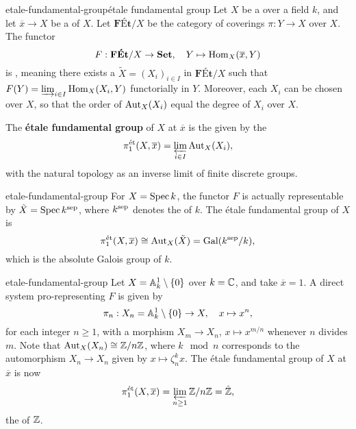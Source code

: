 \begin{topic}{etale-fundamental-group}{étale fundamental group}
    Let $X$ be a  over a field $k$, and let $\overline{x} \to X$ be a  of $X$. Let $\textbf{FÉt}/X$ be the category of   coverings $\pi : Y \to X$ over $X$. The functor
    \[ F : \textbf{FÉt}/X \to \textbf{Set}, \quad Y \mapsto \Hom_X(\overline{x}, Y) \]
    is , meaning there exists a  $\tilde{X} = (X_i)_{i \in I}$ in $\textbf{FÉt}/X$ such that $F(Y) = \varinjlim_{i \in I} \Hom_X(X_i, Y)$ functorially in $Y$. Moreover, each $X_i$ can be chosen  over $X$, so that the order of $\textup{Aut}_X(X_i)$ equal the degree of $X_i$ over $X$.
    
    The \textbf{étale fundamental group} of $X$ at $\overline{x}$ is the  given by the 
    \[ \pi_1^\textup{ét}(X, \overline{x}) = \varprojlim_{i \in I} \textup{Aut}_X(X_i) , \]
    with the natural topology as an inverse limit of finite discrete groups.
\end{topic}

\begin{example}{etale-fundamental-group}
    For $X = \Spec k$, the functor $F$ is actually representable by $\tilde{X} = \Spec k^\textup{sep}$, where $k^\textup{sep}$ denotes the  of $k$. The étale fundamental group of $X$ is
    \[ \pi_1^\textup{ét}(X, \overline{x}) \cong \operatorname{Aut}_X(\tilde{X}) = \operatorname{Gal}(k^\textup{sep}/k) , \]
    which is the absolute Galois group of $k$.
\end{example}

\begin{example}{etale-fundamental-group}
    Let $X = \AA^1_k \setminus \{ 0 \}$ over $k = \CC$, and take $\overline{x} = 1$. A direct system pro-representing $F$ is given by
    \[ \pi_n : X_n = \AA^1_k \setminus \{ 0 \} \to X, \quad x \mapsto x^n , \]
    for each integer $n \ge 1$, with a morphism $X_m \to X_n$, $x \mapsto x^{m/n}$ whenever $n$ divides $m$. Note that $\textup{Aut}_X(X_n) \isom \ZZ/n\ZZ$, where $k \mod n$ corresponds to the automorphism $X_n \to X_n$ given by $x \mapsto \zeta_n^k x$. The étale fundamental group of $X$ at $\overline{x}$ is now
    \[ \pi_1^\textup{ét}(X, \overline{x}) = \varprojlim_{n \ge 1} \ZZ/n\ZZ = \hat{\ZZ} , \]
    the  of $\ZZ$.
\end{example}

